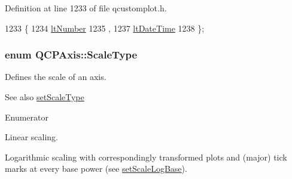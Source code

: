 Definition at line 1233 of file qcustomplot.\+h.


\begin{DoxyCode}
1233                  \{
1234     \hyperlink{class_q_c_p_axis_a4a7da0166f755f5abac23b765d184cada7f1eacf3b73adaefd334bea04e094b7e}{ltNumber} 
1235     ,
1237     \hyperlink{class_q_c_p_axis_a4a7da0166f755f5abac23b765d184cadafc70594a9d877124dd11ccc187d4ac52}{ltDateTime} 
1238   \};
\end{DoxyCode}
\hypertarget{class_q_c_p_axis_a36d8e8658dbaa179bf2aeb973db2d6f0}{}
\subsubsection[{Scale\+Type}]{\setlength{\rightskip}{0pt plus 5cm}enum {\bf Q\+C\+P\+Axis\+::\+Scale\+Type}}\label{class_q_c_p_axis_a36d8e8658dbaa179bf2aeb973db2d6f0}
Defines the scale of an axis. \begin{DoxySeeAlso}{See also}
\hyperlink{class_q_c_p_axis_adef29cae617af4f519f6c40d1a866ca6}{set\+Scale\+Type} 
\end{DoxySeeAlso}
\begin{Desc}
\item[Enumerator]\par
\begin{description}
\item[{\em 
\hypertarget{class_q_c_p_axis_a36d8e8658dbaa179bf2aeb973db2d6f0aff6e30a11a828bc850caffab0ff994f6}{}st\+Linear\label{class_q_c_p_axis_a36d8e8658dbaa179bf2aeb973db2d6f0aff6e30a11a828bc850caffab0ff994f6}
}]Linear scaling. \item[{\em 
\hypertarget{class_q_c_p_axis_a36d8e8658dbaa179bf2aeb973db2d6f0abf5b785ad976618816dc6f79b73216d4}{}st\+Logarithmic\label{class_q_c_p_axis_a36d8e8658dbaa179bf2aeb973db2d6f0abf5b785ad976618816dc6f79b73216d4}
}]Logarithmic scaling with correspondingly transformed plots and (major) tick marks at every base power (see \hyperlink{class_q_c_p_axis_a726186054be90487885a748aa1b42188}{set\+Scale\+Log\+Base}). \end{description}
\end{Desc}


